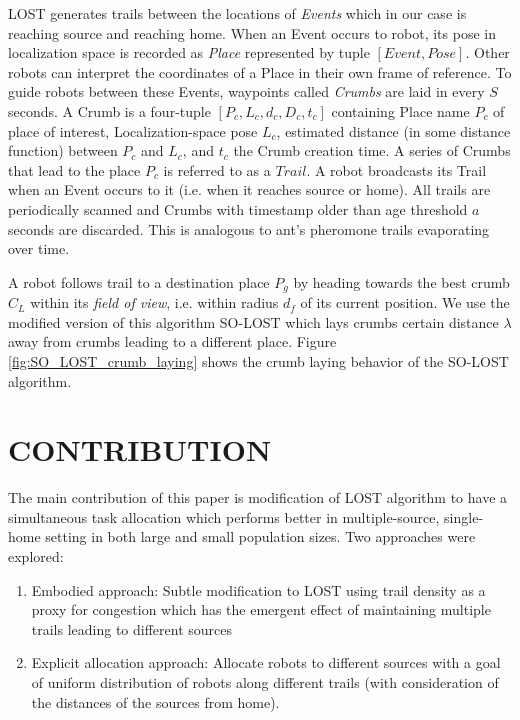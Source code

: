 \documentclass[letterpaper, 10 pt, conference]{ieeeconf}  %
\begin{document}
LOST generates trails between the locations of \emph{Events} which in our case is reaching source and reaching home. When an Event occurs to robot, its pose in localization space is recorded as \emph{Place} represented by tuple $[Event, Pose]$. Other robots can interpret the coordinates of a Place in their own frame of reference. To guide robots between these Events, waypoints called \emph{Crumbs} are laid in every $S$ seconds. A Crumb is a four-tuple $[P_c, L_c, d_c, D_c, t_c]$ containing Place name $P_c$ of place of interest, Localization-space pose $L_c$, estimated distance (in some distance function) between $P_c$ and $L_c$, and $t_c$ the Crumb creation time. A series of Crumbs that lead to the place $P_c$ is referred to as a $Trail$. A robot broadcasts its Trail when an Event occurs to it (i.e. when it reaches source or home). All trails are periodically scanned and Crumbs with timestamp older than age threshold $a$ seconds are discarded. This is analogous to ant's pheromone trails evaporating over time.

A robot follows trail to a destination place $P_g$ by heading towards the best crumb $C_L$ within its \emph{field of view}, i.e. within radius $d_f$ of its current position. We use the modified version of this algorithm SO-LOST which lays crumbs certain distance $\lambda$ away from crumbs leading to a different place. Figure \ref{fig:SO_LOST_crumb_laying} shows the crumb laying behavior of the SO-LOST algorithm. 

\section{CONTRIBUTION}

The main contribution of this paper is modification of LOST algorithm to have a simultaneous task allocation which performs better in multiple-source, single-home setting in both large and small population sizes. Two approaches were explored:

\begin{enumerate}
  \item Embodied approach: Subtle modification to LOST using trail density as a proxy for congestion which has the emergent effect of maintaining multiple trails leading to different sources
  \item Explicit allocation approach: Allocate robots to different sources with a goal of uniform distribution of robots along different trails (with consideration of the distances of the sources from home).
\end{enumerate}
\end{document}
